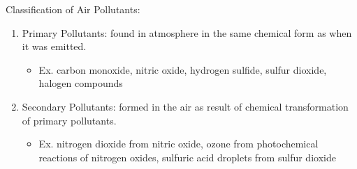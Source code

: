 \documentclass[12pt, a4paper]{article}
\begin{document}
\begin{multicols*}{3}
Classification of Air Pollutants:
\begin{enumerate}[\roman*.]
  \item Primary Pollutants: found in atmosphere in the same chemical form as when it was emitted.
    \begin{itemize}[leftmargin=*]\vspace{3pt}
      \item Ex. carbon monoxide, nitric oxide, hydrogen sulfide, sulfur dioxide, halogen compounds
    \end{itemize}
  \item Secondary Pollutants: formed in the air as result of chemical transformation of primary pollutants. 
    \begin{itemize}[leftmargin=*]\vspace{3pt}
      \item Ex. nitrogen dioxide from nitric oxide, ozone from photochemical reactions of nitrogen oxides, sulfuric acid droplets from sulfur dioxide
    \end{itemize}
\end{enumerate}


\end{multicols*}
\end{document}
